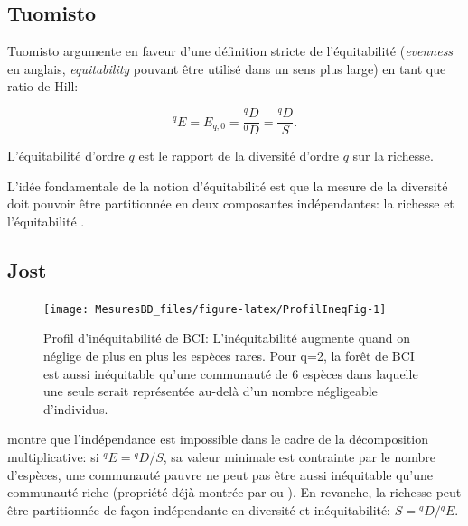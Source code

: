 \documentclass[
  11pt,
  french,
  a4paper,
  extrafontsizes,onecolumn,openright
  ]{memoir}
\begin{document}
\hypertarget{tuomisto}{%
\subsection{Tuomisto}\label{tuomisto}}

Tuomisto argumente en faveur d'une définition stricte de l'équitabilité (\emph{evenness} en anglais, \emph{equitability} pouvant être utilisé dans un sens plus large) en tant que ratio de Hill:

\begin{equation}
  \label{eq:TuomistoEq}
  ^{q}\!E = E_{q,0}
  = \frac{^{q}\!D}{^{0}\!D}
  = \frac{^{q}\!D}{S}.
\end{equation}

L'équitabilité d'ordre \(q\) est le rapport de la diversité d'ordre \(q\) sur la richesse.

L'idée fondamentale de la notion d'équitabilité est que la mesure de la diversité doit pouvoir être partitionnée en deux composantes indépendantes: la richesse et l'équitabilité \autocite{Smith1996}.

\hypertarget{jost}{%
\subsection{Jost}\label{jost}}



\scriptsize

\begin{figure}

{\centering \texttt{[image: MesuresBD\_files/figure-latex/ProfilIneqFig-1]} 

}

\caption{Profil d'inéquitabilité de BCI: L'inéquitabilité augmente quand on néglige de plus en plus les espèces rares. Pour q=2, la forêt de BCI est aussi inéquitable qu'une communauté de 6 espèces dans laquelle une seule serait représentée au-delà d'un nombre négligeable d'individus.}\label{fig:ProfilIneqFig}
\end{figure}

\normalsize

\textcite{Jost2010} montre que l'indépendance est impossible dans le cadre de la décomposition multiplicative: si \(^{q}\!E={^{q}\!D/{S}}\), sa valeur minimale est contrainte par le nombre d'espèces, une communauté pauvre ne peut pas être aussi inéquitable qu'une communauté riche (propriété déjà montrée par \textcite{Sheldon1969} ou \textcite{Alatalo1981}).
En revanche, la richesse peut être partitionnée de façon indépendante en diversité et inéquitabilité: \(S={^{q}\!D}/{^{q}\!E}\).
\end{document}
